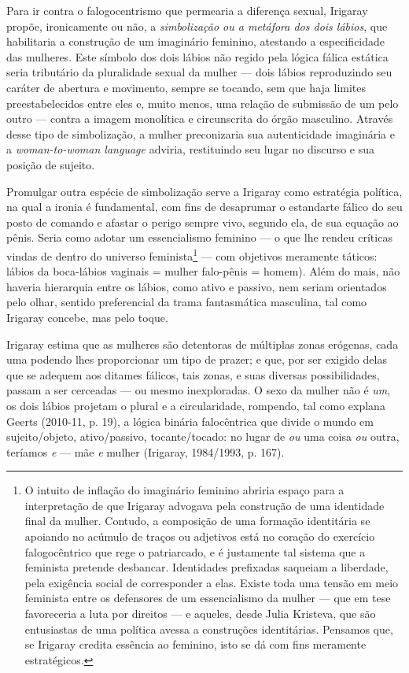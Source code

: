 Para ir contra o falogocentrismo que permearia a diferença sexual,
Irigaray propõe, ironicamente ou não, a \emph{simbolização ou a metáfora
dos dois lábios}, que habilitaria a construção de um imaginário
feminino, atestando a especificidade das mulheres. Este símbolo dos dois
lábios não regido pela lógica fálica estática seria tributário da
pluralidade sexual da mulher --- dois lábios reproduzindo seu caráter de
abertura e movimento, sempre se tocando, sem que haja limites
preestabelecidos entre eles e, muito menos, uma relação de submissão de
um pelo outro --- contra a imagem monolítica e circunscrita do órgão
masculino. Através desse tipo de simbolização, a mulher preconizaria sua
autenticidade imaginária e a \emph{woman-to-woman language} adviria,
restituindo seu lugar no discurso e sua posição de sujeito.

Promulgar outra espécie de simbolização serve a Irigaray como estratégia
política, na qual a ironia é fundamental, com fins de desaprumar o
estandarte fálico do seu posto de comando e afastar o perigo sempre
vivo, segundo ela, de sua equação ao pênis. Seria como adotar um
essencialismo feminino --- o que lhe rendeu críticas vindas de dentro do
universo feminista\footnote{O intuito de inflação do imaginário feminino
  abriria espaço para a interpretação de que Irigaray advogava pela
  construção de uma identidade final da mulher. Contudo, a composição de
  uma formação identitária se apoiando no acúmulo de traços ou adjetivos
  está no coração do exercício falogocêntrico que rege o patriarcado, e
  é justamente tal sistema que a feminista pretende desbancar.
  Identidades prefixadas saqueiam a liberdade, pela exigência social de
  corresponder a elas. Existe toda uma tensão em meio feminista entre os
  defensores de um essencialismo da mulher --- que em tese favoreceria a
  luta por direitos --- e aqueles, desde Julia Kristeva, que são
  entusiastas de uma política avessa a construções identitárias.
  Pensamos que, se Irigaray credita essência ao feminino, isto se dá com
  fins meramente estratégicos.} --- com objetivos meramente táticos:
lábios da boca-lábios vaginais = mulher  falo-pênis = homem). Além do
mais, não haveria hierarquia entre os lábios, como ativo e passivo, nem
seriam orientados pelo olhar, sentido preferencial da trama fantasmática
masculina, tal como Irigaray concebe, mas pelo toque.

Irigaray estima que as mulheres são detentoras de múltiplas zonas
erógenas, cada uma podendo lhes proporcionar um tipo de prazer; e que,
por ser exigido delas que se adequem aos ditames fálicos, tais zonas, e
suas diversas possibilidades, passam a ser cerceadas --- ou mesmo
inexploradas. O sexo da mulher não é \emph{um}, os dois lábios projetam
o plural e a circularidade, rompendo, tal como explana Geerts (2010-11,
p. 19), a lógica binária falocêntrica que divide o mundo em
sujeito/objeto, ativo/passivo, tocante/tocado: no lugar de \emph{ou} uma
coisa \emph{ou} outra, teríamos \emph{e} --- mãe \emph{e} mulher
(Irigaray, 1984/1993, p. 167).

